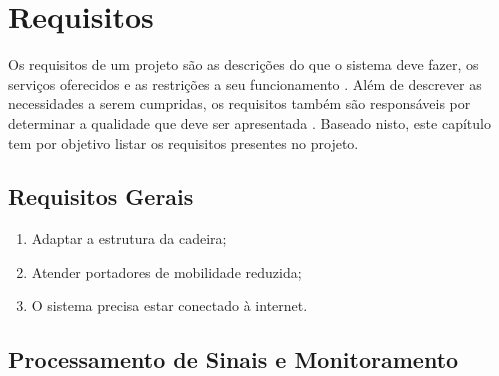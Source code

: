 \chapter{Requisitos}
\label{chap:req}

Os requisitos de um projeto são as descrições do que o sistema deve fazer, os
serviços oferecidos e as restrições a seu funcionamento \cite{sommerville}.
Além de descrever as necessidades a serem cumpridas, os requisitos também são
responsáveis por determinar a qualidade que deve ser apresentada \cite{robertson}.
Baseado nisto, este capítulo tem por objetivo listar os requisitos presentes
no projeto.

\section{Requisitos Gerais}

\begin{enumerate}
  \item Adaptar a estrutura da cadeira;
  \item Atender portadores de mobilidade reduzida;
  \item O sistema precisa estar conectado à internet.
\end{enumerate}

\section{Processamento de Sinais e Monitoramento}

